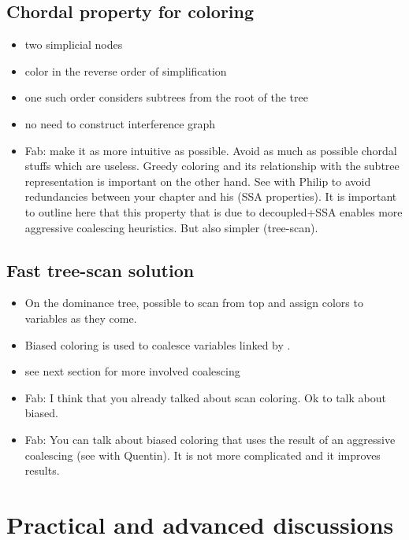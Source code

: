 {\subsection{Chordal property for coloring}
\begin{itemize}
  \item two simplicial nodes
  \item color in the reverse order of simplification
  \item one such order considers subtrees from the root of the tree
  \item no need to construct interference graph
  \item Fab: make it as more intuitive as possible. Avoid as much as possible 
    chordal stuffs which are useless. Greedy coloring and its relationship with 
    the subtree representation is important on the other hand. See with Philip 
    to avoid redundancies between your chapter and his (SSA properties). It is 
    important to outline here that this property that is due to decoupled+SSA 
    enables more aggressive coalescing heuristics. But also simpler 
    (tree-scan).
\end{itemize}

\subsection{Fast tree-scan solution}
\begin{itemize}
  \item On the dominance tree, possible to scan from top and assign colors to 
    variables as they come.
  \item Biased coloring is used to coalesce variables linked by \phifuns.
  \item see next section for more involved coalescing
  \item Fab: I think that you already talked about scan coloring. Ok to talk about biased.
  \item Fab: You can talk about biased coloring that uses the result of an aggressive coalescing (see with Quentin). It is not more complicated and it improves results.
\end{itemize}



\section{Practical and advanced discussions}

}

